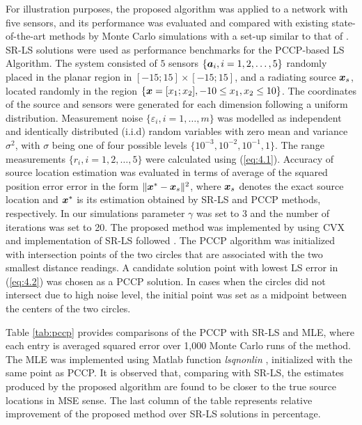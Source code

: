 For illustration purposes, the proposed algorithm was applied to a network with five sensors, and its performance was evaluated and compared with existing state-of-the-art methods by Monte Carlo simulations with a set-up similar to that of \cite{BeckStLi}. SR-LS solutions were used as performance benchmarks for the PCCP-based LS Algorithm. The system consisted of $5$ sensors $\{\mbox{\boldmath$a$}_i, i = 1, 2,\ldots,5\}$ randomly placed in the planar region in $[-15;15]\times[-15;15]$, and a radiating source $\mbox{\boldmath$x$}_s$, located randomly in the region $\{\mbox{\boldmath$x$}=[x_1;x_2], -10\leq x_1,x_2\leq 10\}$. The coordinates of the source and sensors were generated for each dimension following a uniform distribution. Measurement noise $\{\varepsilon_i, i=1,\ldots,m\}$ was modelled as independent and identically distributed (i.i.d) random variables with zero mean and variance $\sigma^2$, with $\sigma$ being one of four possible levels $\{10^{-3}, 10^{-2}, 10^{-1}, 1\}$.  The range measurements $\{r_i, i=1, 2,\ldots,5\}$ were calculated using (\ref{eq:4.1}). Accuracy of source location estimation was evaluated in terms of average of the squared position error error in the form $\|\mbox{\boldmath$x$}^*-\mbox{\boldmath$x$}_s\|^2$, where $\mbox{\boldmath$x$}_s$ denotes the exact source location and $\mbox{\boldmath$x$}^*$ is its estimation obtained by SR-LS and PCCP methods, respectively.   In our simulations parameter $\gamma$ was set to 3 and the number of iterations was set to 20. The proposed method was implemented by using  CVX  \cite{cvx} and implementation of SR-LS followed \cite{BeckStLi}. The PCCP algorithm was initialized with   intersection points of the two circles that are associated with the two smallest distance readings. A candidate solution point with lowest LS error in (\ref{eq:4.2}) was chosen as a PCCP solution. In  cases when the circles did not intersect due to high noise level, the initial point was set as a midpoint between the centers of the two circles.  


Table \ref{tab:pccp}  provides comparisons of the PCCP with SR-LS and MLE, where each entry is averaged squared error over 1,000 Monte Carlo runs of the method. The MLE was implemented using Matlab function \textit{lsqnonlin} \cite{matlab}, initialized with the same point as PCCP. It is observed that, comparing with SR-LS, the estimates produced by the proposed algorithm are found to be closer to the true source locations in MSE sense. The last column of the table  represents relative improvement of the proposed method over SR-LS solutions in percentage. 



